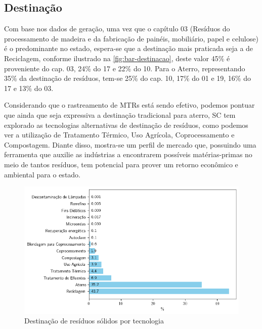 \pagebreak
\subsection{Destinação}

Com base nos dados de geração, uma vez que o capítulo 03 (Resíduos do processamento de madeira e da fabricação de painéis, mobiliário, papel e celulose) é o predominante no estado, espera-se que a destinação mais praticada seja a de Reciclagem, conforme ilustrado na \autoref{fig:bar-destinacao}, deste valor 45\% é proveniente do cap. 03, 24\% do 17 e 22\% do 10. Para o Aterro, representando 35\% da destinação de resíduos, tem-se 25\% do cap. 10, 17\% do 01 e 19, 16\% do 17 e 13\% do 03.

Considerando que o rastreamento de \gls{MTR}s está sendo efetivo, podemos pontuar que ainda que seja expressiva a destinação tradicional para aterro, \gls{SC} tem explorado as tecnologias alternativas de destinação de resíduos, como podemos ver a utilização de Tratamento Térmico, Uso Agrícola, Coprocessamento e Compostagem. Diante disso, mostra-se um perfil de mercado que, possuindo uma ferramenta que auxilie as indústrias a encontrarem possíveis matérias-primas no meio de tantos resíduos, tem potencial para prover um retorno econômico e ambiental para o estado.

\begin{figure}[htb]
	\caption{\label{fig:bar-destinacao} Destinação de resíduos sólidos por tecnologia}
	\begin{center}
		\includegraphics[scale=0.8]{images/bar-destinacao.png}
	\end{center}
\end{figure}
